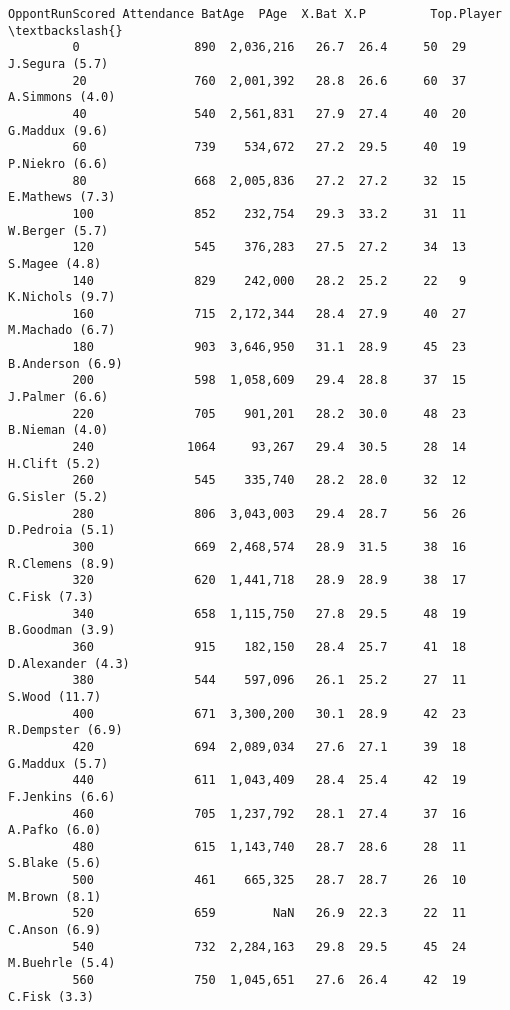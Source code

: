 \documentclass[11pt]{article}
\begin{document}
\begin{Verbatim}[commandchars=\\\{\}]
              OppontRunScored Attendance BatAge  PAge  X.Bat X.P         Top.Player  \textbackslash{}
         0                890  2,036,216   26.7  26.4     50  29     J.Segura (5.7)   
         20               760  2,001,392   28.8  26.6     60  37    A.Simmons (4.0)   
         40               540  2,561,831   27.9  27.4     40  20     G.Maddux (9.6)   
         60               739    534,672   27.2  29.5     40  19     P.Niekro (6.6)   
         80               668  2,005,836   27.2  27.2     32  15    E.Mathews (7.3)   
         100              852    232,754   29.3  33.2     31  11     W.Berger (5.7)   
         120              545    376,283   27.5  27.2     34  13      S.Magee (4.8)   
         140              829    242,000   28.2  25.2     22   9    K.Nichols (9.7)   
         160              715  2,172,344   28.4  27.9     40  27    M.Machado (6.7)   
         180              903  3,646,950   31.1  28.9     45  23   B.Anderson (6.9)   
         200              598  1,058,609   29.4  28.8     37  15     J.Palmer (6.6)   
         220              705    901,201   28.2  30.0     48  23     B.Nieman (4.0)   
         240             1064     93,267   29.4  30.5     28  14      H.Clift (5.2)   
         260              545    335,740   28.2  28.0     32  12     G.Sisler (5.2)   
         280              806  3,043,003   29.4  28.7     56  26    D.Pedroia (5.1)   
         300              669  2,468,574   28.9  31.5     38  16    R.Clemens (8.9)   
         320              620  1,441,718   28.9  28.9     38  17       C.Fisk (7.3)   
         340              658  1,115,750   27.8  29.5     48  19    B.Goodman (3.9)   
         360              915    182,150   28.4  25.7     41  18  D.Alexander (4.3)   
         380              544    597,096   26.1  25.2     27  11      S.Wood (11.7)   
         400              671  3,300,200   30.1  28.9     42  23   R.Dempster (6.9)   
         420              694  2,089,034   27.6  27.1     39  18     G.Maddux (5.7)   
         440              611  1,043,409   28.4  25.4     42  19    F.Jenkins (6.6)   
         460              705  1,237,792   28.1  27.4     37  16      A.Pafko (6.0)   
         480              615  1,143,740   28.7  28.6     28  11      S.Blake (5.6)   
         500              461    665,325   28.7  28.7     26  10      M.Brown (8.1)   
         520              659        NaN   26.9  22.3     22  11      C.Anson (6.9)   
         540              732  2,284,163   29.8  29.5     45  24    M.Buehrle (5.4)   
         560              750  1,045,651   27.6  26.4     42  19       C.Fisk (3.3)   

\end{Verbatim}
\end{document}
